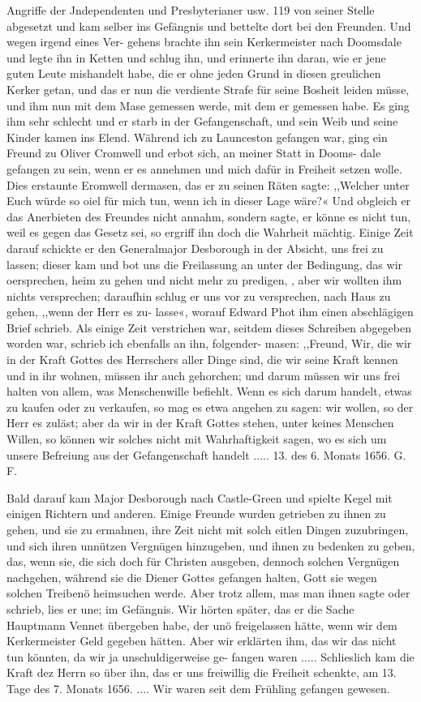 Angriffe der Jndependenten und Presbyterianer usw. 119
von seiner Stelle abgesetzt und kam selber ins Gefängnis und
bettelte dort bei den Freunden. Und wegen irgend eines Ver-
gehens brachte ihn sein Kerkermeister nach Doomsdale und legte
ihn in Ketten und schlug ihn, und erinnerte ihn daran, wie er
jene guten Leute mishandelt habe, die er ohne jeden Grund in
diesen greulichen Kerker getan, und das er nun die verdiente
Strafe für seine Bosheit leiden müsse, und ihm nun mit dem
Mase gemessen werde, mit dem er gemessen habe. Es ging ihm
sehr schlecht und er starb in der Gefangenschaft, und sein Weib
und seine Kinder kamen ins Elend.
Während ich zu Launceston gefangen war, ging ein Freund
zu Oliver Cromwell und erbot sich, an meiner Statt in Dooms-
dale gefangen zu sein, wenn er es annehmen und mich dafür
in Freiheit setzen wolle. Dies erstaunte Eromwell dermasen,
das er zu seinen Räten sagte: ,,Welcher unter Euch würde so oiel
für mich tun, wenn ich in dieser Lage wäre?« Und obgleich er
das Anerbieten des Freundes nicht annahm, sondern sagte, er
könne es nicht tun, weil es gegen das Gesetz sei, so ergriff ihn
doch die Wahrheit mächtig. Einige Zeit darauf schickte er den
Generalmajor Desborough in der Absicht, uns frei zu lassen;
dieser kam und bot uns die Freilassung an unter der Bedingung,
das wir oersprechen, heim zu gehen und nicht mehr zu predigen,
, aber wir wollten ihm nichts versprechen; daraufhin schlug er uns
vor zu versprechen, nach Haus zu gehen, ,,wenn der Herr es zu-
lasse«, worauf Edward Phot ihm einen abschlägigen Brief schrieb.
Als einige Zeit verstrichen war, seitdem dieses Schreiben
abgegeben worden war, schrieb ich ebenfalls an ihn, folgender-
masen:
,,Freund,
Wir, die wir in der Kraft Gottes des Herrschers aller Dinge
sind, die wir seine Kraft kennen und in ihr wohnen, müssen ihr
auch gehorchen; und darum müssen wir uns frei halten von
allem, was Menschenwille befiehlt. Wenn es sich darum handelt,
etwas zu kaufen oder zu verkaufen, so mag es etwa angehen zu
sagen: wir wollen, so der Herr es zuläst; aber da wir in der
Kraft Gottes stehen, unter keines Menschen Willen, so können wir
solches nicht mit Wahrhaftigkeit sagen, wo es sich um unsere
Befreiung aus der Gefangenschaft handelt .....
13. des 6. Monats 1656. G. F.

Bald darauf kam Major Desborough nach Castle-Green und
spielte Kegel mit einigen Richtern und anderen. Einige Freunde
wurden getrieben zu ihnen zu gehen, und sie zu ermahnen, ihre
Zeit nicht mit solch eitlen Dingen zuzubringen, und sich ihren
unnützen Vergnügen hinzugeben, und ihnen zu bedenken zu geben,
das, wenn sie, die sich doch für Christen ausgeben, dennoch solchen
Vergnügen nachgehen, während sie die Diener Gottes gefangen
halten, Gott sie wegen solchen Treibenö heimsuchen werde. Aber
trotz allem, mas man ihnen sagte oder schrieb, lies er une; im
Gefängnis. Wir hörten später, das er die Sache Hauptmann
Vennet übergeben habe, der unö freigelassen hätte, wenn wir
dem Kerkermeister Geld gegeben hätten. Aber wir erklärten ihm,
das wir das nicht tun könnten, da wir ja unschuldigerweise ge-
fangen waren ..... Schlieslich kam die Kraft dez Herrn so
über ihn, das er uns freiwillig die Freiheit schenkte, am 13. Tage
des 7. Monats 1656. .... Wir waren seit dem Frühling
gefangen gewesen.